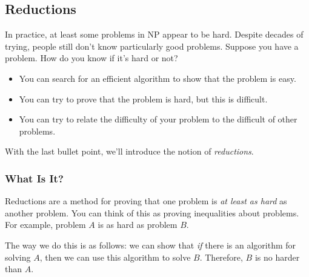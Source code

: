 \documentclass[letterpaper]{article}
\begin{document}
\subsection{Reductions}
In practice, at least some problems in NP appear to be hard. Despite decades of trying, people still don't know particularly good problems. Suppose you have a problem. How do you know if it's hard or not? 
\begin{itemize}
    \item You can search for an efficient algorithm to show that the problem is easy.
    \item You can try to prove that the problem is hard, but this is difficult. 
    \item You can try to relate the difficulty of your problem to the difficult of other problems.
\end{itemize}
With the last bullet point, we'll introduce the notion of \emph{reductions}. 

\subsubsection{What Is It?}
Reductions are a method for proving that one problem is \emph{at least as hard} as another problem. You can think of this as proving inequalities about problems. For example, problem $A$ is as hard as problem $B$. 

\bigskip 

The way we do this is as follows: we can show that \emph{if} there is an algorithm for solving $A$, then we can use this algorithm to solve $B$. Therefore, $B$ is no harder than $A$. 

\bigskip 
\end{document}
